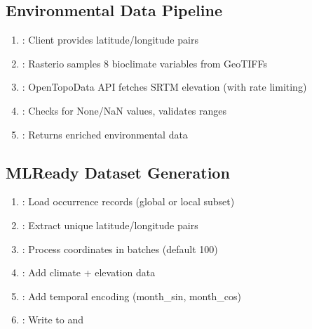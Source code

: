 \documentclass[letterpaper,10pt,english]{sphinxmanual}
\begin{document}
\subsection{Environmental Data Pipeline}
\label{\detokenize{architecture:environmental-data-pipeline}}\begin{enumerate}
%
\item {} 
\sphinxAtStartPar
{}: Client provides latitude/longitude pairs

\item {} 
\sphinxAtStartPar
{}: Rasterio samples 8 bioclimate variables from GeoTIFFs

\item {} 
\sphinxAtStartPar
{}: Open\sphinxhyphen{}Topo\sphinxhyphen{}Data API fetches SRTM elevation (with rate limiting)

\item {} 
\sphinxAtStartPar
{}: Checks for None/NaN values, validates ranges

\item {} 
\sphinxAtStartPar
{}: Returns enriched environmental data

\end{enumerate}


\subsection{ML\sphinxhyphen{}Ready Dataset Generation}
\label{\detokenize{architecture:ml-ready-dataset-generation}}\begin{enumerate}
%
\item {} 
\sphinxAtStartPar
{}: Load occurrence records (global or local subset)

\item {} 
\sphinxAtStartPar
{}: Extract unique latitude/longitude pairs

\item {} 
\sphinxAtStartPar
{}: Process coordinates in batches (default 100)

\item {} 
\sphinxAtStartPar
{}: Add climate + elevation data

\item {} 
\sphinxAtStartPar
{}: Add temporal encoding (month\_sin, month\_cos)

\item {} 
\sphinxAtStartPar
{}: Write to  and 

\end{enumerate}
\end{document}
